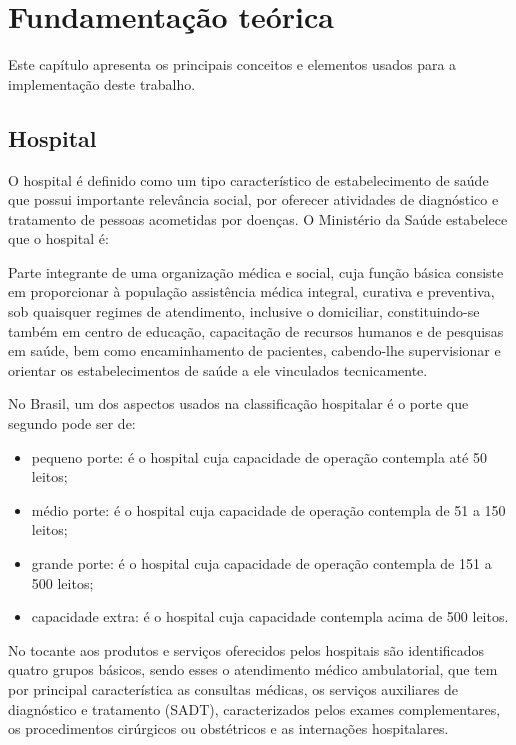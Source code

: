 \chapter{Fundamentação teórica}

Este capítulo apresenta os principais conceitos e elementos usados para a implementação deste trabalho.

\section{Hospital}
O hospital é definido como um tipo característico de estabelecimento de saúde que possui importante relevância social, por oferecer atividades de diagnóstico e tratamento de pessoas acometidas por doenças. O Ministério da Saúde estabelece que o hospital é:
\begin{citacao}
Parte integrante de uma organização médica e social, cuja função básica consiste em proporcionar à população assistência médica integral, curativa e preventiva, sob quaisquer regimes de atendimento, inclusive o domiciliar, constituindo-se também em centro de educação, capacitação de recursos humanos e de pesquisas em saúde, bem como encaminhamento de pacientes, cabendo-lhe supervisionar e orientar os estabelecimentos de saúde a ele vinculados tecnicamente.\cite[p.09]{portaria30/1977}
\end{citacao}

No Brasil, um dos aspectos usados na classificação hospitalar é o porte que segundo   pode ser de:
	
\begin{itemize}
    \item pequeno porte: é o hospital cuja capacidade de operação contempla até 50 leitos;
	
    \item médio porte: é o hospital cuja capacidade de operação contempla de 51 a 150 leitos;

    \item grande porte: é o hospital cuja capacidade de operação contempla de 151 a 500 leitos;

    \item capacidade extra: é o hospital cuja capacidade contempla acima de 500 leitos.
\end{itemize}

No tocante aos produtos e serviços oferecidos pelos hospitais são identificados quatro grupos básicos, sendo esses o atendimento médico ambulatorial, que tem por principal característica as consultas médicas, os serviços auxiliares de diagnóstico e tratamento (SADT), caracterizados pelos exames complementares, os procedimentos cirúrgicos ou obstétricos e as internações hospitalares. \cite{castro}


